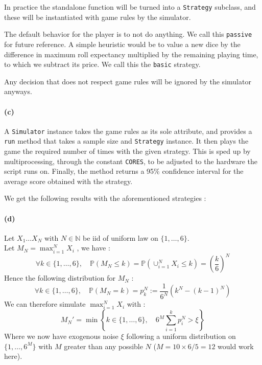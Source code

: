 \documentclass{article}
\newcommand{\dice}{\{1,\dots,6\}}
\renewcommand{\P}{\mathbb P}
\newcommand{\getoutput}[1]{}
\begin{document}
    In practice the standalone function will be turned into a
    \texttt{Strategy} subclass, and these will be instantiated with
    game rules by the simulator.

    The default behavior for the player is to not do anything.
    We call this \texttt{passive} for future reference.
    A simple heuristic would be to value a new dice by
    the difference in maximum roll expectancy multiplied by the remaining
    playing time, to which we subtract its price.
    We call this the \texttt{basic} strategy.

    Any decision that does not respect game rules will be ignored by the simulator anyways.


    \paragraph{(c)}
    A \texttt{Simulator} instance takes the game rules as its sole
    attribute, and provides a \texttt{run} method that takes a
    sample size and \texttt{Strategy} instance.
    It then plays the game the required number of times with the given strategy.
    This is sped up by multiprocessing, through the constant \texttt{CORES},
    to be adjusted to the hardware the script runs on.
    Finally, the method returns a 95\% confidence interval for the average
    score obtained with the strategy.

    We get the following results with the aforementioned strategies :
    \getoutput{1c}


    \paragraph{(d)}
    Let $X_1\dots X_N$ with $N\in\mathbb N$ be iid of uniform law on $\dice$.\\
    Let $M_N=\max_{i=1}^NX_i$ , we have :
    \begin{equation}
        \forall k\in\dice,\quad
        \mathbb{P}(M_N\leq k)=\P\left(\cup_{i=1}^NX_i\leq k\right)
        =\left(\frac{k}{6}\right)^N
    \end{equation}
    Hence the following distribution for $M_N$ :
    \begin{equation}
        \forall k\in\dice,\quad
        \mathbb{P}(M_N=k)=p^N_k:=\frac{1}{6^N}\left(k^N-(k-1)^N\right)
    \end{equation}
    We can therefore simulate $\max_{i=1}^NX_i$ with :
    \begin{equation}
        M_N'=\min\left\{
            k\in\dice,\quad6^M\sum_{i=1}^kp^N_i>\xi
        \right\}
    \end{equation}
    Where we now have exogenous noise $\xi$ following a uniform distribution on
    $\{1,\dots,6^M\}$ with $M$ greater than any possible $N$
    ($M=10\times6/5=12$ would work here).
\end{document}
